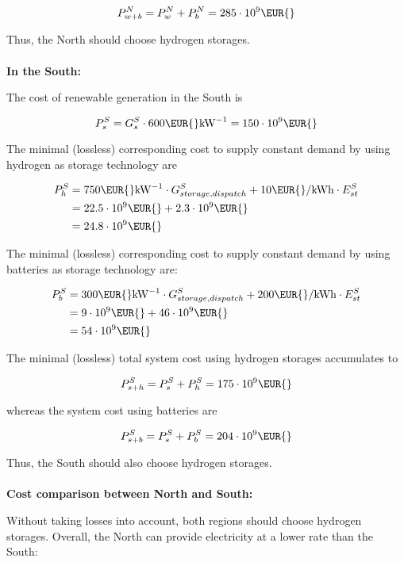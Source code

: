 \documentclass[11pt,a4paper,fleqn]{scrartcl}
\newcommand{\eur}{\text{\EUR{}}}
\begin{document}
\begin{enumerate}[(a)]
 $$P_{w+b}^N = P_w^N + P_b^N = 285 \cdot 10^9\eur$$

 Thus, the North should choose hydrogen storages.\\~\\

 \textbf{In the South:}

 The cost of renewable generation in the South is

 $$P_s^S=G^S_s \cdot 600 \text{\EUR{}}\si{\per\kilo\watt}=150\cdot10^9\text{\EUR{}} $$

 The minimal (lossless) corresponding cost to supply constant demand by using hydrogen as storage technology are

 \begin{align*}
  P_h^S & = 750 \text{\EUR{}}\si{\per\kilo\watt} \cdot G_{storage,dispatch}^S + 10 \text{\EUR{}/kWh} \cdot E_{st}^S \\
        & = 22.5 \cdot 10^9 \eur + 2.3 \cdot 10^9 \eur                                                                                  \\
        & = 24.8 \cdot 10^9 \eur
 \end{align*}

 The minimal (lossless) corresponding cost to supply constant demand by using batteries as storage technology are:

 \begin{align*}
  P_b^S & = 300 \text{\EUR{}}\si{\per\kilo\watt} \cdot G_{storage,dispatch}^S + 200 \text{\EUR{}/kWh} \cdot E_{st}^S \\
        & = 9 \cdot 10^9 \eur + 46 \cdot 10^9 \eur                                                                                      \\
        & = 54 \cdot 10^9 \eur
 \end{align*}

 The minimal (lossless) total system cost using hydrogen storages accumulates to

 $$P_{s+h}^S = P_s^S + P_h^S = 175 \cdot 10^9\eur$$

 whereas the system cost using batteries are

 $$P_{s+b}^S = P_s^S + P_b^S = 204 \cdot 10^9\eur$$

 Thus, the South should also choose hydrogen storages.\\~\\

 \textbf{Cost comparison between North and South:}

 Without taking losses into account, both regions should choose hydrogen storages. Overall, the North can provide electricity at a lower rate than the South:


\end{enumerate}
\end{document}
